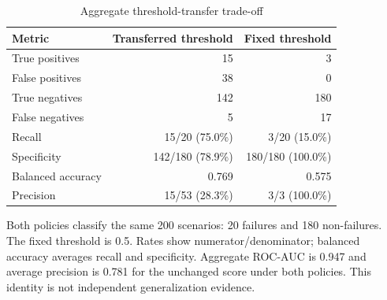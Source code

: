 \begin{table}[htbp]\centering\small
\caption{Aggregate threshold-transfer trade-off}\label{tab:T3}
\begin{tabular}{lrr}
\toprule
Metric & Transferred threshold & Fixed threshold \\
\midrule
True positives & 15 & 3 \\
False positives & 38 & 0 \\
True negatives & 142 & 180 \\
False negatives & 5 & 17 \\
Recall & 15/20 (75.0\%) & 3/20 (15.0\%) \\
Specificity & 142/180 (78.9\%) & 180/180 (100.0\%) \\
Balanced accuracy & 0.769 & 0.575 \\
Precision & 15/53 (28.3\%) & 3/3 (100.0\%) \\
\bottomrule
\end{tabular}
\par\smallskip
\begin{minipage}{\linewidth}\footnotesize Both policies classify the same 200 scenarios: 20 failures and 180 non-failures. The fixed threshold is 0.5. Rates show numerator/denominator; balanced accuracy averages recall and specificity. Aggregate ROC-AUC is 0.947 and average precision is 0.781 for the unchanged score under both policies. This identity is not independent generalization evidence.\end{minipage}
\end{table}
